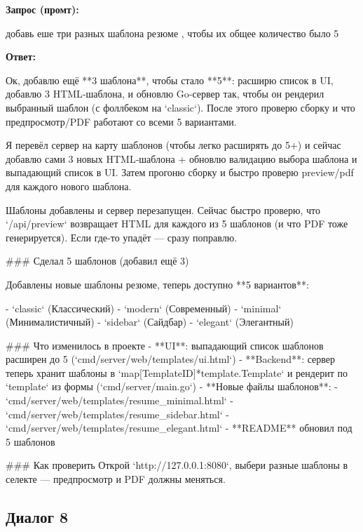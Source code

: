 \documentclass[a4paper, 14pt]{extarticle} %
\begin{document}
\textbf{Запрос (промт):}

\begin{PromptBlock}

добавь еше три разных шаблона резюме , чтобы их общее количество было 5

\end{PromptBlock}

\textbf{Ответ:}

\begin{AnswerBlock}

Ок, добавлю ещё **3 шаблона**, чтобы стало **5**: расширю список в UI, добавлю 3 HTML‑шаблона, и обновлю Go‑сервер так, чтобы он рендерил выбранный шаблон (с фоллбеком на `classic`). После этого проверю сборку и что предпросмотр/PDF работают со всеми 5 вариантами.

Я перевёл сервер на карту шаблонов (чтобы легко расширять до 5+) и сейчас добавлю сами 3 новых HTML‑шаблона + обновлю валидацию выбора шаблона и выпадающий список в UI. Затем прогоню сборку и быстро проверю preview/pdf для каждого нового шаблона.

Шаблоны добавлены и сервер перезапущен. Сейчас быстро проверю, что `/api/preview` возвращает HTML для каждого из 5 шаблонов (и что PDF тоже генерируется). Если где-то упадёт — сразу поправлю.

### Сделал 5 шаблонов (добавил ещё 3)

Добавлены новые шаблоны резюме, теперь доступно **5 вариантов**:

- `classic` (Классический)
- `modern` (Современный)
- `minimal` (Минималистичный)
- `sidebar` (Сайдбар)
- `elegant` (Элегантный)

### Что изменилось в проекте
- **UI**: выпадающий список шаблонов расширен до 5 (`cmd/server/web/templates/ui.html`)
- **Backend**: сервер теперь хранит шаблоны в `map[TemplateID]*template.Template` и рендерит по `template` из формы (`cmd/server/main.go`)
- **Новые файлы шаблонов**:
  - `cmd/server/web/templates/resume_minimal.html`
  - `cmd/server/web/templates/resume_sidebar.html`
  - `cmd/server/web/templates/resume_elegant.html`
- **README** обновил под 5 шаблонов

### Как проверить
Открой `http://127.0.0.1:8080`, выбери разные шаблоны в селекте — предпросмотр и PDF должны меняться.

\end{AnswerBlock}

\subsection*{Диалог 8}
\end{document}
